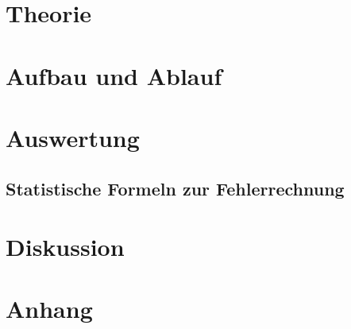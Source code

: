 \documentclass[a4,11pt]{article}
\newcommand{\V}{V401}
\begin{document}



\tableofcontents
\clearpage


\section{Theorie}

\clearpage


\section{Aufbau und Ablauf}

\clearpage


\section{Auswertung}
\subsection{Statistische Formeln zur Fehlerrechnung}
\label{sec:Fehlerrechnung}

%
\clearpage

\clearpage


\section{Diskussion}


\clearpage
\section{Anhang}
\listoftodos
\listoffigures
\listoftables
\nocite{\V}
\printbibliography[title = Literaturverzeichnis]
\end{document}
